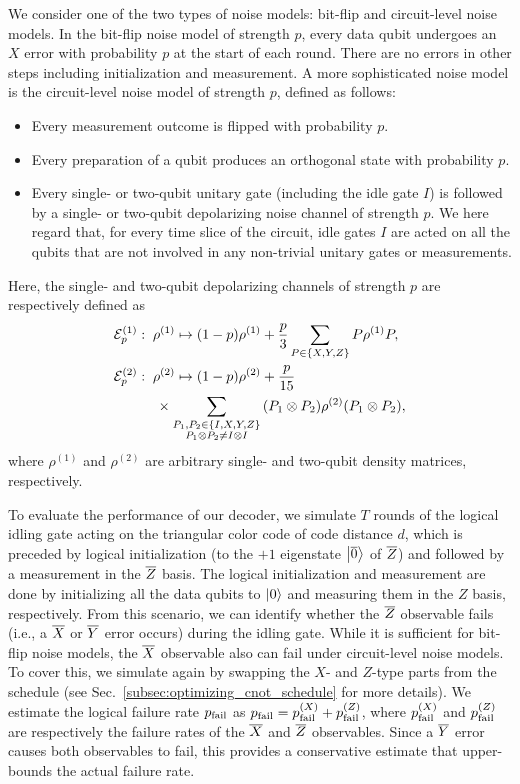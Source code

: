 \documentclass[a4paper,twocolumn,11pt,accepted=2025-01-21]{quantumarticle}
\theoremstyle{definition}
\theoremstyle{definition}
\theoremstyle{definition}
\begin{document}
We consider one of the two types of noise models: bit-flip and circuit-level noise models.
In the bit-flip noise model of strength $p$, every data qubit undergoes an $X$ error with probability $p$ at the start of each round.
There are no errors in other steps including initialization and measurement.
A more sophisticated noise model is the circuit-level noise model of strength $p$, defined as follows:
\begin{itemize}
    \item Every measurement outcome is flipped with probability $p$.
    \item Every preparation of a qubit produces an orthogonal state with probability $p$.
    \item Every single- or two-qubit unitary gate (including the idle gate $I$) is followed by a single- or two-qubit depolarizing noise channel of strength $p$. We here regard that, for every time slice of the circuit, idle gates $I$ are acted on all the qubits that are not involved in any non-trivial unitary gates or measurements.
\end{itemize}
Here, the single- and two-qubit depolarizing channels of strength $p$ are respectively defined as
\begin{align*}
    &\mathcal{E}_{p}^{(1)}:\; \rho^{(1)} \mapsto (1 - p) \rho^{(1)} + \frac{p}{3} \sum_{P \in \qty{X, Y, Z}} P \rho^{(1)} P, \\ 
    &\mathcal{E}_{p}^{(2)}:\; \rho^{(2)} \mapsto (1 - p) \rho^{(2)} + \frac{p}{15} \\ 
    &\qquad\quad \times \sum_{\substack{P_1, P_2 \in \qty{I, X, Y, Z} \\ P_1 \otimes P_2 \neq I \otimes I}} \qty(P_1 \otimes P_2) \rho^{(2)} \qty(P_1 \otimes P_2),
\end{align*}
where $\rho^{(1)}$ and $\rho^{(2)}$ are arbitrary single- and two-qubit density matrices, respectively.

To evaluate the performance of our decoder, we simulate $T$ rounds of the logical idling gate acting on the triangular color code of code distance $d$, which is preceded by logical initialization (to the $+1$ eigenstate $\ket{\overline{0}}$ of $\overline{Z}$) and followed by a measurement in the $\overline{Z}$ basis.
The logical initialization and measurement are done by initializing all the data qubits to $\ket{0}$ and measuring them in the $Z$ basis, respectively.
From this scenario, we can identify whether the $\overline{Z}$ observable fails (i.e., a $\overline{X}$ or $\overline{Y}$ error occurs) during the idling gate.
While it is sufficient for bit-flip noise models, the $\overline{X}$ observable also can fail under circuit-level noise models.
To cover this, we simulate again by swapping the $X$- and $Z$-type parts from the \cnot schedule (see Sec.~\ref{subsec:optimizing_cnot_schedule} for more details).
We estimate the logical failure rate $p_{\mathrm{fail}}$ as $p_{\mathrm{fail}} = p_{\mathrm{fail}}^{(X)} + p_{\mathrm{fail}}^{(Z)}$, where $p_{\mathrm{fail}}^{(X)}$ and $p_{\mathrm{fail}}^{(Z)}$ are respectively the failure rates of the $\overline{X}$ and $\overline{Z}$ observables.
Since a $\overline{Y}$ error causes both observables to fail, this provides a conservative estimate that upper-bounds the actual failure rate.
\end{document}
